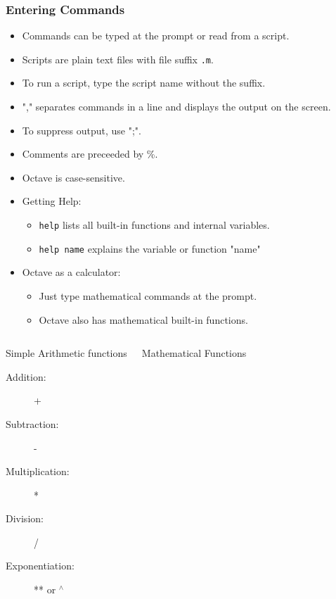\documentclass[t,compress,xcolor=svgnames]{beamer}
\newenvironment{eblock}[0]
{
\begin{beamerboxesrounded}[upper=uppercol2,lower=lowercol2,shadow=true]}
{\end{beamerboxesrounded}}
\begin{document}
\begin{frame}[allowframebreaks]
  \frametitle{\small Entering Commands}
  \begin{itemize}
    \item Commands can be typed at the prompt or read from a script.
    \item Scripts are plain text files with file suffix \texttt{.m}.
    \item To run a script, type the script name without the suffix.
    \item "," separates commands in a line and displays the output on the screen.
    \item To suppress output, use ";".
    \item Comments are preceeded by \%.
    \item Octave is case-sensitive.
    \item Getting Help:
    \begin{itemize}
      \item \texttt{help} lists all built-in functions and internal variables.
      \item \texttt{help name} explains the variable or function "name"
    \end{itemize}
    \framebreak
    \item Octave as a calculator:
    \begin{itemize}
      \item Just type mathematical commands at the prompt.
      \item Octave also has mathematical built-in functions.
    \end{itemize}
  \end{itemize}
  \begin{columns}
    \begin{eblock}{Simple Arithmetic functions}
      \begin{description}
        \item[Addition:] +
        \item[Subtraction:] -
        \item[Multiplication:] *
        \item[Division:] /
        \item[Exponentiation:] ** or $^\wedge$
      \end{description}
    \end{eblock}
    \begin{eblock}{Mathematical Functions}
      \begin{description}

\end{description}
\end{eblock}
\end{columns}
\end{frame}
\end{document}
